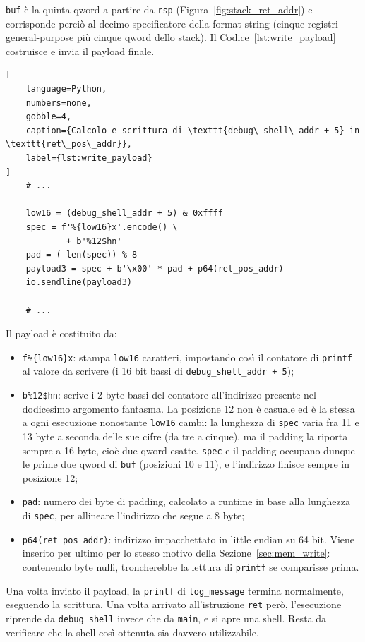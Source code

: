 \texttt{buf} è la quinta qword a partire da \texttt{rsp} (Figura~\ref{fig:stack_ret_addr}) e corrisponde perciò al decimo specificatore della format string (cinque registri general-purpose più cinque qword dello stack). Il Codice~\ref{lst:write_payload} costruisce e invia il payload finale.
\begin{lstlisting}[
    language=Python,
    numbers=none,
    gobble=4,
    caption={Calcolo e scrittura di \texttt{debug\_shell\_addr + 5} in \texttt{ret\_pos\_addr}},
    label={lst:write_payload}
]
    # ...
 
    low16 = (debug_shell_addr + 5) & 0xffff
    spec = f'%{low16}x'.encode() \
            + b'%12$hn'
    pad = (-len(spec)) % 8
    payload3 = spec + b'\x00' * pad + p64(ret_pos_addr)
    io.sendline(payload3)

    # ...
\end{lstlisting}
Il payload è costituito da:
\begin{itemize}
    \item \texttt{f\textquotesingle\%\{low16\}x\textquotesingle}: stampa \texttt{low16} caratteri, impostando così il contatore di \texttt{printf} al valore da scrivere (i 16 bit bassi di \texttt{debug\_shell\_addr + 5});
    \item \texttt{b\textquotesingle\%12\$hn\textquotesingle}: scrive i 2 byte bassi del contatore all'indirizzo presente nel dodicesimo argomento fantasma. La posizione 12 non è casuale ed è la stessa a ogni esecuzione nonostante \texttt{low16} cambi: la lunghezza di \texttt{spec} varia fra 11 e 13 byte a seconda delle sue cifre (da tre a cinque), ma il padding la riporta sempre a 16 byte, cioè due qword esatte. \texttt{spec} e il padding occupano dunque le prime due qword di \texttt{buf} (posizioni 10 e 11), e l'indirizzo finisce sempre in posizione 12;
    \item \texttt{pad}: numero dei byte di padding, calcolato a runtime in base alla lunghezza di \texttt{spec}, per allineare l'indirizzo che segue a 8 byte;
    \item \texttt{p64(ret\_pos\_addr)}: indirizzo impacchettato in little endian su 64 bit. Viene inserito per ultimo per lo stesso motivo della Sezione~\ref{sec:mem_write}: contenendo byte nulli, troncherebbe la lettura di \texttt{printf} se comparisse prima.
\end{itemize}

Una volta inviato il payload, la \texttt{printf} di \texttt{log\_message} termina normalmente, eseguendo la scrittura. Una volta arrivato all'istruzione \texttt{ret} però, l'esecuzione riprende da \texttt{debug\_shell} invece che da \texttt{main}, e si apre una shell. Resta da verificare che la shell così ottenuta sia davvero utilizzabile.


